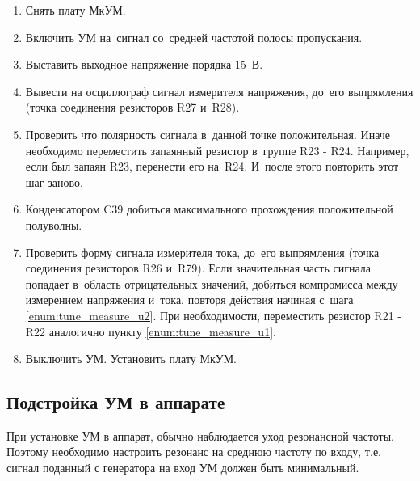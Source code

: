 \begin{enumerate}
	\item Снять плату МкУМ.
	\item Включить УМ на~сигнал со~средней частотой полосы пропускания.
	\item Выставить выходное напряжение порядка 15~В.
	\item Вывести на осциллограф сигнал измерителя напряжения, до~его выпрямления (точка соединения резисторов R27 и~R28).
	\item Проверить что полярность сигнала в~данной точке положительная. Иначе необходимо переместить запаянный резистор в~группе R23 - R24. Например, если был запаян R23, перенести его на~R24. И~после этого повторить этот шаг заново. \label{enum:tune_measure_u1}
	\item Конденсатором C39 добиться максимального прохождения положительной полуволны. \label{enum:tune_measure_u2}
	\item Проверить форму сигнала измерителя тока, до~его выпрямления (точка соединения резисторов R26 и~R79). Если значительная часть сигнала попадает в~область отрицательных значений, добиться компромисса между измерением напряжения и~тока, повторя действия начиная с~шага \ref{enum:tune_measure_u2}. При необходимости, переместить резистор R21 - R22 аналогично пункту \ref{enum:tune_measure_u1}.
	\item Выключить УМ. Установить плату МкУМ.
\end{enumerate}	



\subsection{Подстройка УМ в аппарате}

При установке УМ в аппарат, обычно наблюдается уход резонансной частоты. Поэтому необходимо настроить резонанс на среднюю частоту по входу, т.е. сигнал поданный с генератора на вход УМ должен быть минимальный.
